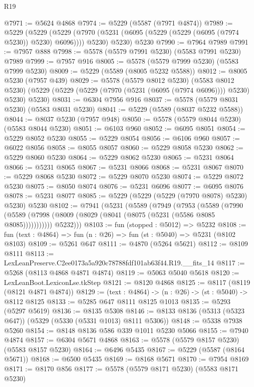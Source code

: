 \begin{lexlean}{R19}
\begin{coremodule}
@7971 := @5624 @4868
@7974 := @5229 (@5587 (@7971 @4874))
@7989 := @5229
    (@5229
      (@5229 (@7970 (@5231 (@6095 (@5229 (@5229 (@6095 (@7974 @5230)) @5230) @6096)))) @5230)
      @5230)
    @5230
@7990 := @7964 @7989
@7991 := @7957 @888
@7998 := @5578 (@5579 @7991 @5230) (@5583 @7991 @5230) @7989
@7999 := @7957 @916
@8005 := @5578 (@5579 @7999 @5230) (@5583 @7999 @5230)
@8009 := @5229 (@5589 (@8005 @5232 @5588))
@8012 := @8005 @5230 (@7957 @439)
@8029 := @5578
    (@5579 @8012 @5230)
    (@5583 @8012 @5230)
    (@5229 (@5229 (@5229 (@7970 (@5231 (@6095 (@7974 @6096)))) @5230) @5230) @5230)
@8031 := @6304 @7956 @916
@8037 := @5578 (@5579 @8031 @5230) (@5583 @8031 @5230)
@8041 := @5229 (@5589 (@8037 @5232 @5588))
@8044 := @8037 @5230 (@7957 @948)
@8050 := @5578 (@5579 @8044 @5230) (@5583 @8044 @5230)
@8051 := @6103 @960
@8052 := @6095 @8051
@8054 := @5229 @8052 @5230
@8055 := @5229 @8054
@8056 := @6106 @960
@8057 := @6022 @8056
@8058 := @8055 @8057
@8060 := @5229 @8058 @5230
@8062 := @5229 @8060 @5230
@8064 := @5229 @8062 @5230
@8065 := @5231 @8064
@8066 := @5231 @8065
@8067 := @5231 @8066
@8068 := @5231 @8067
@8070 := @5229 @8068 @5230
@8072 := @5229 @8070 @5230
@8074 := @5229 @8072 @5230
@8075 := @8050 @8074
@8076 := @5231 @6096
@8077 := @6095 @8076
@8078 := @5231 @8077
@8085 := @5229 (@5229 (@5229 (@7970 @8078) @5230) @5230) @5230
@8102 := @7941
    (@5231
      (@5589
        (@7949
          (@7953
            (@5589
              (@7990 (@5589 (@7998 (@8009 (@8029 (@8041 (@8075 (@5231 (@5586 @8085 @8085)))))))))))
          @5232)))
@8103 := fun (stopped : @5012) => @5232
@8108 := fun (text : @4864) => fun (n : @26) => fun (st : @5040) => @5231 (@8102 @8103)
@8109 := @5261 @647
@8111 := @4870 (@5264 @5621)
@8112 := @8109 @8111
@8113 := LexLeanPreserve.C2ee0173a5a920c78788fdf101ab63f44.R19.__fits_14
@8117 := @5268 (@8113 @4868 @4871 @4874)
@8119 := @5063 @5040 @5618
@8120 := LexLeanBoot.LexiconLse.tkStep
@8121 := @8120 @4868
@8125 := @8117 (@8119 (@8121 @4871 @4874))
@8129 := (text : @4864) -> (n : @26) -> (st : @5040) -> @8112 @8125
@8133 := @5285 @647 @8111 @8125 @1013
@8135 := @5293 (@5297 @5619)
@8136 := @8135 @5308
@8146 := @8133 @8136 (@5313 (@5323 @647)) (@5329 (@5330 (@5331 @1013) @8111 @5306))
@8148 := @5338 @7938 @5260
@8154 := @8148 @8136 @586 @339 @1011 @5230 @5066
@8155 := @7940 @4874
@8157 := @6304 @5671 @4868
@8163 := @5578 (@5579 @8157 @5230) (@5583 @8157 @5230)
@8164 := @6496 @5435
@8167 := @5229 (@5587 (@8164 @5671))
@8168 := @6500 @5435
@8169 := @8168 @5671
@8170 := @7954 @8169
@8171 := @8170 @856
@8177 := @5578 (@5579 @8171 @5230) (@5583 @8171 @5230)

\end{coremodule}
\end{lexlean}
